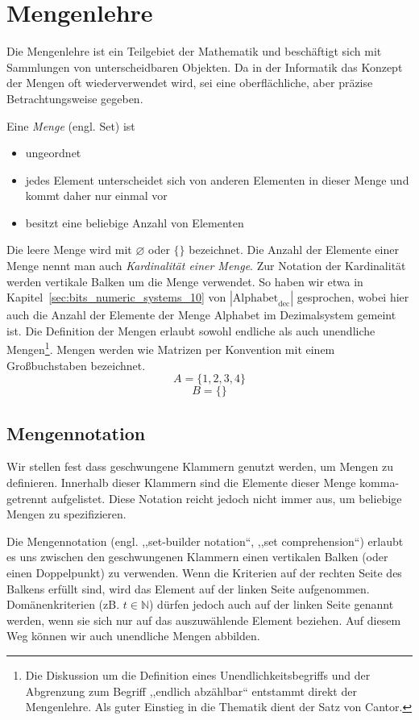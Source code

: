 \chapter{Mengenlehre}
%
Die Mengenlehre ist ein Teilgebiet der Mathematik und beschäftigt sich mit Sammlungen von unterscheidbaren Objekten. Da in der Informatik das Konzept der Mengen oft wiederverwendet wird, sei eine oberflächliche, aber präzise Betrachtungsweise gegeben.

Eine \emph{Menge} (engl. Set) ist
\begin{itemize}
 \item ungeordnet
 \item jedes Element unterscheidet sich von anderen Elementen in dieser Menge und kommt daher nur einmal vor
 \item besitzt eine beliebige Anzahl von Elementen
\end{itemize}
%
Die leere Menge wird mit $\diameter$ oder $\{\}$ bezeichnet. Die Anzahl der Elemente einer Menge nennt man auch \emph{Kardinalität einer Menge}. Zur Notation der Kardinalität werden vertikale Balken um die Menge verwendet. So haben wir etwa in Kapitel~\ref{sec:bits_numeric_systems_10} von $|\text{Alphabet}_{\text{dec}}|$ gesprochen, wobei hier auch die Anzahl der Elemente der Menge Alphabet im Dezimalsystem gemeint ist. Die Definition der Mengen erlaubt sowohl endliche als auch unendliche Mengen\footnote{Die Diskussion um die Definition eines Unendlichkeitsbegriffs und der Abgrenzung zum Begriff ,,endlich abzählbar`` entstammt direkt der Mengenlehre. Als guter Einstieg in die Thematik dient der Satz von Cantor.}. Mengen werden wie Matrizen per Konvention mit einem Großbuchstaben bezeichnet.
%
\[
   A = \{1, 2, 3, 4\}
\] \[
   B = \{\}
\]

\section{Mengennotation}
%
Wir stellen fest dass geschwungene Klammern genutzt werden, um Mengen zu definieren. Innerhalb dieser Klammern sind die Elemente dieser Menge komma-getrennt aufgelistet. Diese Notation reicht jedoch nicht immer aus, um beliebige Mengen zu spezifizieren.

Die Mengennotation (engl. ,,set-builder notation``, ,,set comprehension``) erlaubt es uns zwischen den geschwungenen Klammern einen vertikalen Balken (oder einen Doppelpunkt) zu verwenden. Wenn die Kriterien auf der rechten Seite des Balkens erfüllt sind, wird das Element auf der linken Seite aufgenommen. Domänenkriterien (zB. $t \in \mathbb{N}$) dürfen jedoch auch auf der linken Seite genannt werden, wenn sie sich nur auf das auszuwählende Element beziehen. Auf diesem Weg können wir auch unendliche Mengen abbilden.


